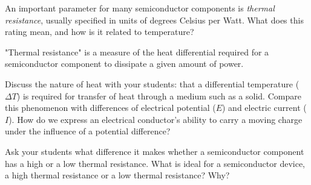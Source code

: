 

An important parameter for many semiconductor components is {\it thermal resistance}, usually specified in units of degrees Celsius per Watt.  What does this rating mean, and how is it related to temperature?







"Thermal resistance" is a measure of the heat differential required for a semiconductor component to dissipate a given amount of power.  







Discuss the nature of heat with your students: that a differential temperature ($\Delta T$) is required for transfer of heat through a medium such as a solid.  Compare this phenomenon with differences of electrical potential ($E$) and electric current ($I$).  How do we express an electrical conductor's ability to carry a moving charge under the influence of a potential difference?  

Ask your students what difference it makes whether a semiconductor component has a high or a low thermal resistance.  What is ideal for a semiconductor device, a high thermal resistance or a low thermal resistance?  Why?



